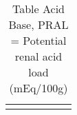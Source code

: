 \documentclass[../main.tex]{subfiles}
\begin{document}

\clearpage
\thispagestyle{empty}

\begin{longtable}{p{4.5cm}p{0.5cm}p{1cm}|p{4.5cm}p{0.5cm}p{1cm}}
  \caption[Table Acid Base]{Table Acid Base, PRAL = Potential renal acid load (mEq/100g)}
  \centering
  \end{longtable}
\end{document}

